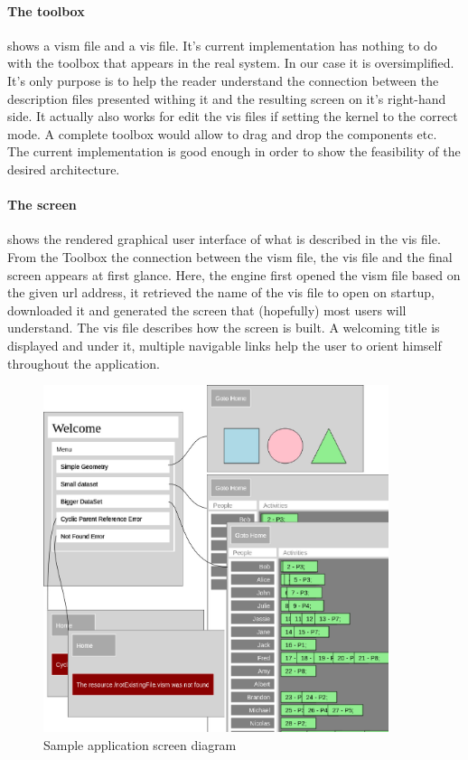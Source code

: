 \paragraph{The toolbox} shows a vism file and a vis file. It's current implementation has nothing to do with the toolbox that appears in the real system. In our case it is oversimplified. It's only purpose is to help the reader understand the connection between the description files presented withing it and the resulting screen on it's right-hand side. It actually also works for edit the vis files if setting the kernel to the correct mode. A complete toolbox would allow to drag and drop the components etc. The current implementation is good enough in order to show the feasibility of the desired architecture.

\paragraph{The screen} shows the rendered graphical user interface of what is described in the vis file. From the Toolbox the connection between the vism file, the vis file and the final screen appears at first glance. Here, the engine first opened the vism file based on the given url address, it retrieved the name of the vis file to open on startup, downloaded it and generated the screen that (hopefully) most users will understand. The vis file describes how the screen is built. A welcoming title is displayed and under it, multiple navigable links help the user to orient himself throughout the application.

\begin{figure}
    \centering
    \includegraphics[width=0.9\textwidth]{images/screens.jpg}
    \caption{Sample application screen diagram}
    \label{img:screens}
\end{figure}

